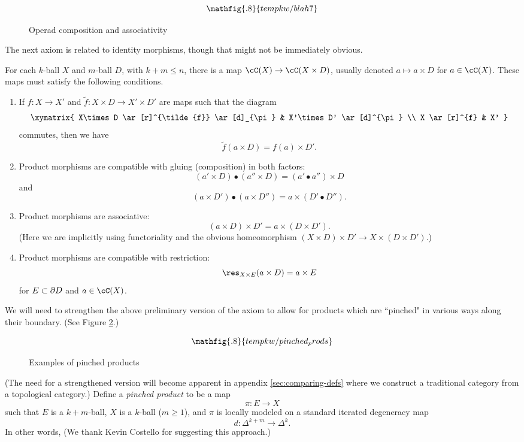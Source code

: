 \begin{figure}[!ht]
$$\mathfig{.8}{tempkw/blah7}$$
\caption{Operad composition and associativity}\label{blah7}\end{figure}

The next axiom is related to identity morphisms, though that might not be immediately obvious.

\begin{axiom}
For each $k$-ball $X$ and $m$-ball $D$, with $k+m \le n$, there is a map $\cC(X)\to \cC(X\times D)$, 
usually denoted $a\mapsto a\times D$ for $a\in \cC(X)$.
These maps must satisfy the following conditions.
\begin{enumerate}
\item
If $f:X\to X'$ and $\tilde{f}:X\times D \to X'\times D'$ are maps such that the diagram
\[ \xymatrix{
	X\times D \ar[r]^{\tilde{f}} \ar[d]_{\pi} & X'\times D' \ar[d]^{\pi} \\
	X \ar[r]^{f} & X'
} \]
commutes, then we have 
\[
	\tilde{f}(a\times D) = f(a)\times D' .
\]
\item
Product morphisms are compatible with gluing (composition) in both factors:
\[
	(a'\times D)\bullet(a''\times D) = (a'\bullet a'')\times D
\]
and
\[
	(a\times D')\bullet(a\times D'') = a\times (D'\bullet D'') .
\]
\item
Product morphisms are associative:
\[
	(a\times D)\times D' = a\times (D\times D') .
\]
(Here we are implicitly using functoriality and the obvious homeomorphism
$(X\times D)\times D' \to X\times(D\times D')$.)
\item
Product morphisms are compatible with restriction:
\[
	\res_{X\times E}(a\times D) = a\times E
\]
for $E\subset \partial D$ and $a\in \cC(X)$.
\end{enumerate}
\end{axiom}

We will need to strengthen the above preliminary version of the axiom to allow
for products which are ``pinched" in various ways along their boundary.
(See Figure \ref{pinched_prods}.)
\begin{figure}[t]
$$\mathfig{.8}{tempkw/pinched_prods}$$
\caption{Examples of pinched products}\label{pinched_prods}
\end{figure}
(The need for a strengthened version will become apparent in appendix \ref{sec:comparing-defs}
where we construct a traditional category from a topological category.)
Define a {\it pinched product} to be a map
\[
	\pi: E\to X
\]
such that $E$ is a $k{+}m$-ball, $X$ is a $k$-ball ($m\ge 1$), and $\pi$ is locally modeled
on a standard iterated degeneracy map
\[
	d: \Delta^{k+m}\to\Delta^k .
\]
In other words, 
(We thank Kevin Costello for suggesting this approach.)

